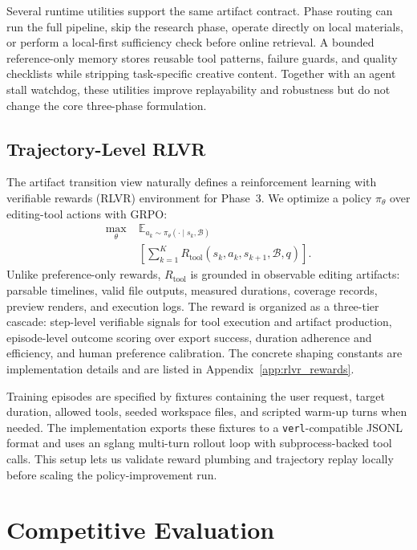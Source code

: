 ﻿\documentclass[11pt]{article}
\begin{document}
Several runtime utilities support the same artifact contract. Phase routing can
run the full pipeline, skip the research phase, operate directly on local
materials, or perform a local-first sufficiency check before online retrieval.
A bounded reference-only memory stores reusable tool patterns, failure guards,
and quality checklists while stripping task-specific creative content. Together
with an agent stall watchdog, these utilities improve replayability and
robustness but do not change the core three-phase formulation.

\subsection{Trajectory-Level RLVR}

The artifact transition view naturally defines a reinforcement learning with
verifiable rewards (RLVR) environment for Phase~3. We optimize a policy
$\pi_{\theta}$ over editing-tool actions with GRPO:
\[
    \begin{aligned}
    \max_{\theta}\;
    &\mathbb{E}_{a_k\sim\pi_{\theta}(\cdot\mid s_k,\mathcal{B})}\\
    &\left[\sum_{k=1}^{K}
    R_{\mathrm{tool}}(s_k,a_k,s_{k+1},\mathcal{B},q)\right].
    \end{aligned}
\]
Unlike preference-only rewards, $R_{\mathrm{tool}}$ is grounded in observable
editing artifacts: parsable timelines, valid file outputs, measured durations,
coverage records, preview renders, and execution logs. The reward is organized
as a three-tier cascade: step-level verifiable signals for tool execution and
artifact production, episode-level outcome scoring over export success,
duration adherence and efficiency, and human preference calibration.
The concrete shaping constants are implementation details and are listed in
Appendix~\ref{app:rlvr_rewards}.

Training episodes are specified by fixtures containing the user request, target
duration, allowed tools, seeded workspace files, and scripted warm-up turns when
needed. The implementation exports these fixtures to a \texttt{verl}-compatible
JSONL format and uses an sglang multi-turn rollout loop with subprocess-backed
tool calls. This setup lets us validate reward plumbing and trajectory replay
locally before scaling the policy-improvement run.

\section{Competitive Evaluation}
\end{document}
